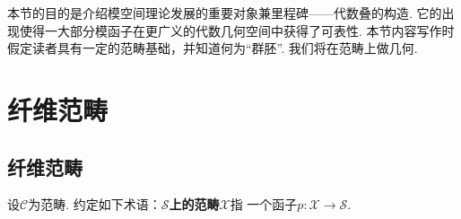 \newcommand{\cov}{\operatorname{Cov}}
\newcommand{\mor}{\operatorname{Mor}}
\newcommand{\ob}{\operatorname{Ob}}
\newcommand{\open}{\operatorname{Top}}
\newcommand{\et}{\mathrm{ét}}
\newcommand{\fppf}{\mathrm{fppf}}
\newcommand{\sch}[1]{\operatorname{Sch}_{#1}}

本节的目的是介绍模空间理论发展的重要对象兼里程碑——代数叠的构造.
它的出现使得一大部分模函子在更广义的代数几何空间中获得了可表性.
本节内容写作时假定读者具有一定的范畴基础，并知道何为“群胚”. 
我们将在范畴上做几何.

\section{纤维范畴}
\subsection{纤维范畴}
设$\mathcal{C}$为范畴. 
约定如下术语：\textbf{$\mathcal{S}$上的范畴$\mathcal{X}$}指
一个函子$p:\mathcal{X} \to \mathcal{S}$.

